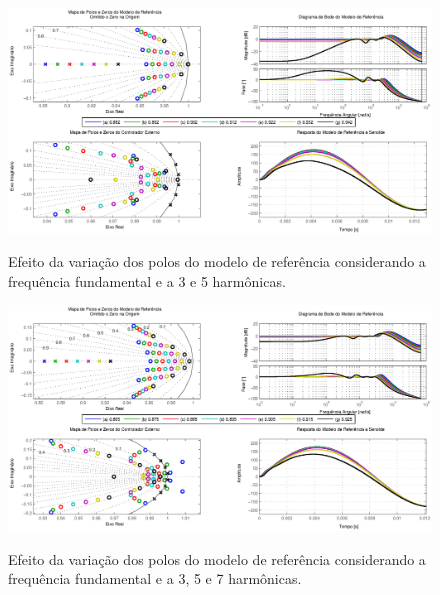 \documentclass[repeatfields,oneside]{tcc}
\begin{document}
\begin{figure}[!ht]
    \centering
    \caption{Efeito da variação dos polos do modelo de referência considerando a frequência fundamental e a 3{\textordfeminine} e 5{\textordfeminine} harmônicas.}
    \includegraphics[trim={80 20 80 10}, clip, width=\linewidth]{fig/f_5.eps}
    \\
\end{figure}

\begin{figure}[!ht]
    \centering
    \caption{Efeito da variação dos polos do modelo de referência considerando a frequência fundamental e a 3{\textordfeminine}, 5{\textordfeminine} e 7{\textordfeminine} harmônicas.}
    \includegraphics[trim={80 20 80 10}, clip, width=\linewidth]{fig/f_7.eps}
    \\
\end{figure}
\end{document}

